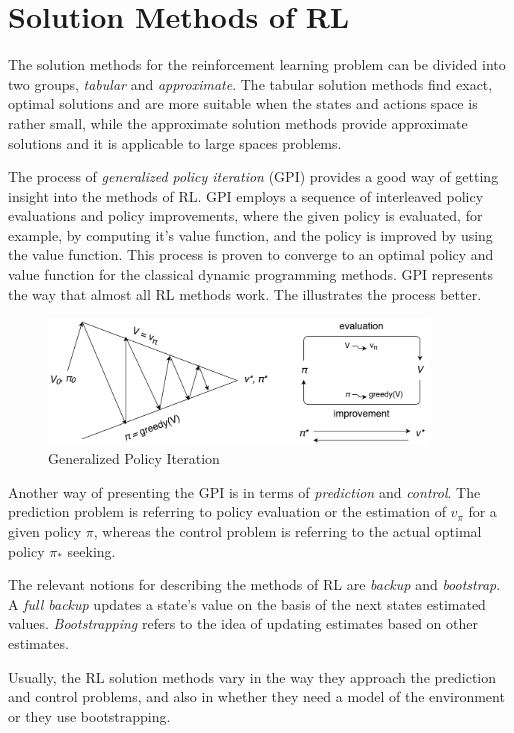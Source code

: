 \section{Solution Methods of RL}\label{Solution Methods}
The solution methods for the reinforcement learning problem can be divided into two groups, \textit{tabular} and \textit{approximate}. The tabular solution methods find exact, optimal solutions and are more suitable when the states and actions space is rather small, while the approximate solution methods provide approximate solutions and it is applicable to large spaces problems.

The process of \textit{generalized policy iteration} (GPI) provides a good way of getting insight into the methods of RL. GPI employs a sequence of interleaved policy evaluations and policy improvements, where the given policy is evaluated, for example, by computing it's value function, and the policy is improved by using the value function. This process is proven to converge to an optimal policy and value function for the classical dynamic programming methods. GPI represents the way that almost all RL methods work. The  illustrates the process better.
\begin{figure}[H]
	\centering
	\includegraphics[width=0.9\textwidth]{Figures/GPI}
	\caption{Generalized Policy Iteration}
	\label{fig:GPI}
\end{figure}
Another way of presenting the GPI is in terms of \textit{prediction} and \textit{control}. The prediction problem is referring to policy evaluation or the estimation of $v_{\pi}$ for a given policy $\pi$, whereas the control problem is referring to the actual optimal policy $\pi_{*}$ seeking.

The relevant notions for describing the methods of RL are \textit{backup} and \textit{bootstrap}. A \textit{full backup} updates a state's value on the basis of the next states estimated values. \textit{Bootstrapping} refers to the idea of updating estimates based on other estimates.

Usually, the RL solution methods vary in the way they approach the prediction and control problems, and also in whether they need a model of the environment or they use bootstrapping.

